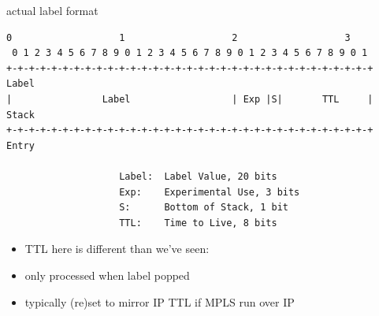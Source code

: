 \begin{frame}[fragile]{actual label format}
\begin{Verbatim}[fontsize=\small]
 0                   1                   2                   3
 0 1 2 3 4 5 6 7 8 9 0 1 2 3 4 5 6 7 8 9 0 1 2 3 4 5 6 7 8 9 0 1
+-+-+-+-+-+-+-+-+-+-+-+-+-+-+-+-+-+-+-+-+-+-+-+-+-+-+-+-+-+-+-+-+ Label
|                Label                  | Exp |S|       TTL     | Stack
+-+-+-+-+-+-+-+-+-+-+-+-+-+-+-+-+-+-+-+-+-+-+-+-+-+-+-+-+-+-+-+-+ Entry

                    Label:  Label Value, 20 bits
                    Exp:    Experimental Use, 3 bits
                    S:      Bottom of Stack, 1 bit
                    TTL:    Time to Live, 8 bits
\end{Verbatim}
\begin{itemize}
\item TTL here is different than we've seen:
\item only processed when label popped
\item typically (re)set to mirror IP TTL if MPLS run over IP
\end{itemize}
\end{frame}


